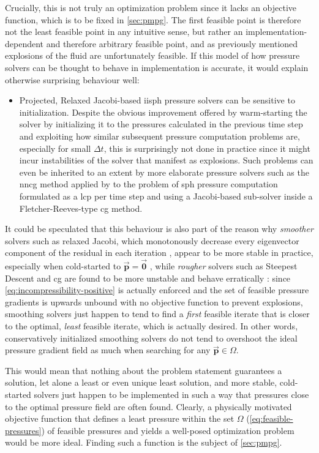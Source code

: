 \documentclass[conference]{IEEEtran}
\newcommand\vek[1]{\vec{\bm{#1}}}
\begin{document}
Crucially, this is not truly an optimization problem since it lacks an objective function, which is to be fixed in \autoref{sec:pmpg}. The first feasible point is therefore not the least feasible point in any intuitive sense, but rather an implementation-dependent and therefore arbitrary feasible point, and as previously mentioned explosions of the fluid are unfortunately feasible. If this model of how pressure solvers can be thought to behave in implementation is accurate, it would explain otherwise surprising behaviour well:
\begin{itemize}
  \item Projected, Relaxed Jacobi-based \ac{iisph} pressure solvers can be sensitive to initialization. Despite the obvious improvement offered by warm-starting the solver by initializing it to the pressures calculated in the previous time step and exploiting how similar subsequent pressure computation problems are, especially for small $\Delta t$, this is surprisingly not done in practice since it might incur instabilities of the solver that manifest as explosions. Such problems can even be inherited to an extent by more elaborate pressure solvers such as the \ac{nncg} method applied by \autocite[Probst and Teschner]{unified-pressure-probst} to the problem of \ac{sph} pressure computation formulated as a \ac{lcp} per time step and using a Jacobi-based sub-solver inside a Fletcher-Reeves-type \ac{cg} method.
\end{itemize}

It could be speculated that this behaviour is also part of the reason why \textit{smoother} solvers such as relaxed Jacobi, which monotonously decrease every eigenvector component of the residual in each iteration \cite{painless-cg}, appear to be more stable in practice, especially when cold-started to $\vek{p}=\vek{0}$ \cite{iisph}, while \textit{rougher} solvers such as Steepest Descent and \ac{cg} \cite{painless-cg} are found to be more unstable and behave erratically \cite{iisph}: since \autoref{eq:incompressibility-positive} is actually enforced and the set of feasible pressure gradients is upwards unbound with no objective function to prevent explosions, smoothing solvers just happen to tend to find a \textit{first} feasible iterate that is closer to the optimal, \textit{least} feasible iterate, which is actually desired. In other words, conservatively initialized smoothing solvers do not tend to overshoot the ideal pressure gradient field as much when searching for any $\vek{p}\in\Omega$.

This would mean that nothing about the problem statement guarantees a solution, let alone a least or even unique least solution, and more stable, cold-started solvers just happen to be implemented in such a way that pressures close to the optimal pressure field are often found. Clearly, a physically motivated objective function that defines a least pressure within the set $\Omega$ (\autoref{eq:feasible-pressures}) of feasible pressures and yields a well-posed optimization problem would be more ideal. Finding such a function is the subject of \autoref{sec:pmpg}.
\end{document}

